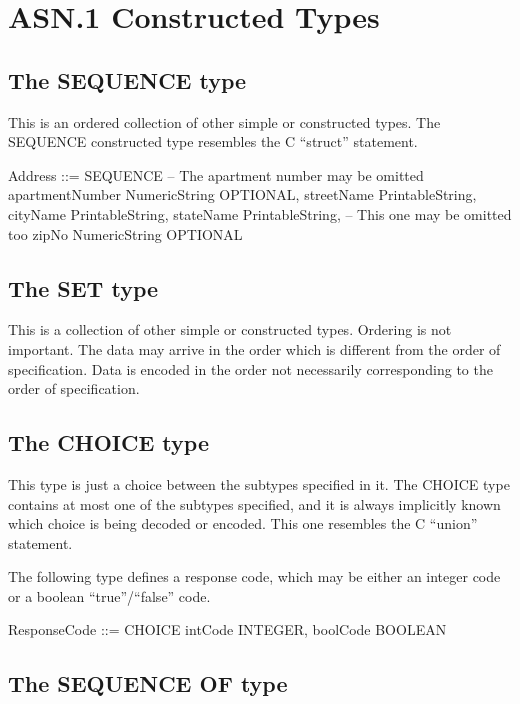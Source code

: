 \documentclass[english,oneside,12pt]{book}
\begin{document}
\section{ASN.1 Constructed Types}


\subsection{The SEQUENCE type}

This is an ordered collection of other simple or constructed types.
The SEQUENCE constructed type resembles the C ``struct'' statement.
\begin{asn}
Address ::= SEQUENCE {
    -- The apartment number may be omitted
    apartmentNumber      NumericString OPTIONAL,
    streetName           PrintableString,
    cityName             PrintableString,
    stateName            PrintableString,
    -- This one may be omitted too
    zipNo                NumericString OPTIONAL
}
\end{asn}

\subsection{The SET type}

This is a collection of other simple or constructed types. Ordering
is not important. The data may arrive in the order which is different
from the order of specification. Data is encoded in the order not
necessarily corresponding to the order of specification.


\subsection{The CHOICE type}

This type is just a choice between the subtypes specified in it. The
CHOICE type contains at most one of the subtypes specified, and it
is always implicitly known which choice is being decoded or encoded.
This one resembles the C ``union'' statement.

The following type defines a response code, which may be either an
integer code or a boolean ``true''/``false'' code.
\begin{asn}
ResponseCode ::= CHOICE {
    intCode    INTEGER,
    boolCode   BOOLEAN
}
\end{asn}

\subsection{The SEQUENCE OF type}
\end{document}

